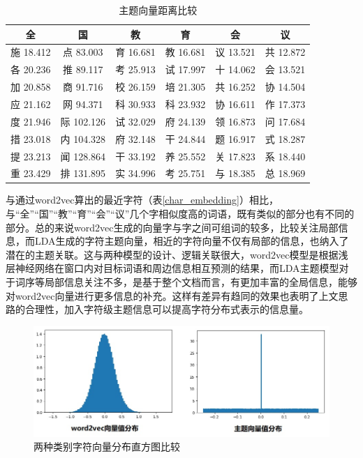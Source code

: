 \documentclass[winfonts,master,oneside,nobackinfo]{njuthesis}
\begin{document}
\begin{table}[h]
\centering
\begin{tabular}{cccccc} %
\hline 
全& 国& 教& 育& 会& 议\\
\hline  
施 18.412& 点 83.003& 育 16.681& 教 16.681&议 13.521&共 12.872\\
各 20.236& 推 89.117& 考 25.913& 试 17.997&十 14.062&会 13.521\\
加 20.858& 商 91.716& 校 26.159& 培 21.305&共 16.252&协 14.504\\
应 21.162& 网 94.371& 科 30.933& 科 23.932&协 16.611&作 17.373\\
度 21.946& 际 102.126& 试 32.029& 府 24.139&领 16.873&问 17.684\\
措 23.018& 内 104.328& 府 32.148& 干 24.844&题 16.917&式 18.287\\
提 23.213& 闻 128.864& 干 33.192& 养 25.552&关 17.823&系 18.440\\
重 23.429& 排 131.895& 实 34.996& 考 25.751&与 18.385&总 18.969\\
\hline 
\end{tabular}
\caption{主题向量距离比较}
\label{near-topic}
\end{table}

与通过word2vec算出的最近字符（表\ref{char_embedding}）相比，与“全”“国”“教”“育”“会”“议”几个字相似度高的词语，既有类似的部分也有不同的部分。总的来说word2vec生成的向量字与字之间可组词的较多，比较关注局部信息，而LDA生成的字符主题向量，相近的字符向量不仅有局部的信息，也纳入了潜在的主题关联。这与两种模型的设计、逻辑关联很大，word2vec模型是根据浅层神经网络在窗口内对目标词语和周边信息相互预测的结果，而LDA主题模型对于词序等局部信息关注不多，是基于整个文档而言，有更加丰富的全局信息，能够对word2vec向量进行更多信息的补充。这样有差异有趋同的效果也表明了上文思路的合理性，加入字符级主题信息可以提高字符分布式表示的信息量。

\begin{figure}[H]
\centering
\includegraphics[width=1\textwidth]{./figure/分布.jpg}
\caption{两种类别字符向量分布直方图比较}
\label{two-distribution}
\end{figure}
\end{document}
